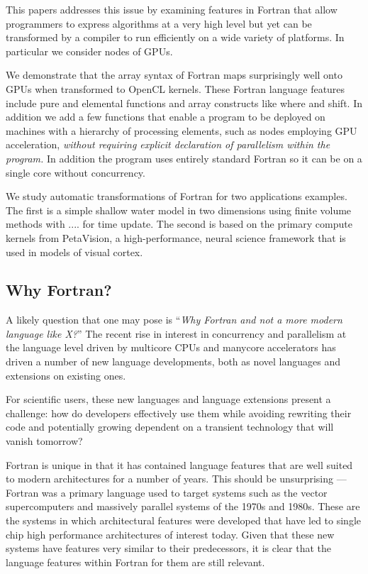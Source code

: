 \documentclass[10pt, conference, compsocconf]{IEEEtran}
\begin{document}
This papers addresses this issue by examining features in Fortran that
allow programmers to express algorithms at a very high level but yet
can be transformed by a compiler to run efficiently on a wide variety
of platforms.  In particular we consider nodes of GPUs.

We demonstrate that the array syntax of Fortran maps surprisingly well
onto GPUs when transformed to OpenCL kernels.  These Fortran language
features include pure and elemental functions and array constructs
like where and shift.  In addition we add a few functions that enable
a program to be deployed on machines with a hierarchy of processing elements,
such as nodes employing GPU acceleration,
\emph{without requiring explicit declaration of parallelism within the program.}
In addition the program uses entirely standard Fortran so it can be
on a single core without concurrency.

We study automatic transformations of Fortran for two applications examples.
The first is a simple shallow water model in two dimensions using
finite volume methods with .... for time update.  The second is based
on the primary compute kernels from PetaVision, a high-performance, 
neural science framework that is used in models of visual cortex.

\subsection{Why Fortran?}

A likely question that one may pose is ``\emph{Why Fortran and not a more modern language like X?}''
The recent rise in interest in concurrency and parallelism at the language level driven by multicore CPUs and
manycore accelerators has driven a number of new language developments, both as novel languages and extensions
on existing ones.

For scientific users, these new languages and language extensions present a challenge: how do developers effectively use them while avoiding rewriting their code and potentially growing dependent on a transient technology that will vanish tomorrow?  

Fortran is unique in that it has contained language features that are well suited to modern architectures for a number of years.
This should be unsurprising --- Fortran was a primary language used to target systems such as the vector supercomputers and massively parallel systems of the 1970s and 1980s.  These are the systems in which architectural features were developed that have led to single chip high performance architectures of interest today.  Given that these new systems have features very similar to their predecessors, it is clear that the language features within Fortran for them are still relevant.
\end{document}
